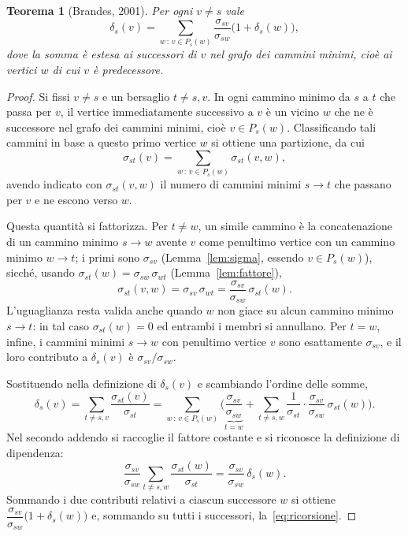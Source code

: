 \documentclass[11pt,a4paper]{report}
\newtheorem{teorema}{Teorema}
\begin{document}
\begin{teorema}[Brandes, 2001]\label{th:ricorsione}
	Per ogni $v\neq s$ vale
	\[
		\delta_s(v)=\sum_{w\,:\,v\in P_s(w)}
		\frac{\sigma_{sv}}{\sigma_{sw}}\bigl(1+\delta_s(w)\bigr),
	\]
	dove la somma è estesa ai \emph{successori} di $v$ nel grafo dei cammini
	minimi, cioè ai vertici $w$ di cui $v$ è predecessore.
\end{teorema}
\begin{proof}
	\renewcommand{\qedsymbol}{}
	Si fissi $v\neq s$ e un bersaglio $t\neq s,v$. In ogni cammino minimo da $s$ a
	$t$ che passa per $v$, il vertice immediatamente successivo a $v$ è un vicino
	$w$ che ne è successore nel grafo dei cammini minimi, cioè $v\in P_s(w)$.
	Classificando tali cammini in base a questo primo vertice $w$ si ottiene una
	partizione, da cui
	\[
		\sigma_{st}(v)=\sum_{w\,:\,v\in P_s(w)}\sigma_{st}(v,w),
	\]
	avendo indicato con $\sigma_{st}(v,w)$ il numero di cammini minimi $s\to t$ che
	passano per $v$ e ne escono verso $w$.

	Questa quantità si fattorizza. Per $t\neq w$, un simile cammino è la
	concatenazione di un cammino minimo $s\to w$ avente $v$ come penultimo vertice
	con un cammino minimo $w\to t$; i primi sono $\sigma_{sv}$ (Lemma~\ref{lem:sigma},
	essendo $v\in P_s(w)$), sicché, usando $\sigma_{st}(w)=\sigma_{sw}\,\sigma_{wt}$
	(Lemma~\ref{lem:fattore}),
	\[
		\sigma_{st}(v,w)=\sigma_{sv}\,\sigma_{wt}=\frac{\sigma_{sv}}{\sigma_{sw}}\,\sigma_{st}(w).
	\]
	L'uguaglianza resta valida anche quando $w$ non giace su alcun cammino minimo
	$s\to t$: in tal caso $\sigma_{st}(w)=0$ ed entrambi i membri si annullano. Per
	$t=w$, infine, i cammini minimi $s\to w$ con penultimo vertice $v$ sono
	esattamente $\sigma_{sv}$, e il loro contributo a $\delta_s(v)$ è
	$\sigma_{sv}/\sigma_{sw}$.

	Sostituendo nella definizione di $\delta_s(v)$ e scambiando l'ordine delle
	somme,
	\[
		\delta_s(v)=\sum_{t\neq s,v}\frac{\sigma_{st}(v)}{\sigma_{st}}
		=\sum_{w\,:\,v\in P_s(w)}\Biggl(
		\underbrace{\frac{\sigma_{sv}}{\sigma_{sw}}}_{t=w}
		+\sum_{t\neq s,w}\frac{1}{\sigma_{st}}\cdot\frac{\sigma_{sv}}{\sigma_{sw}}\,\sigma_{st}(w)
		\Biggr).
	\]
	Nel secondo addendo si raccoglie il fattore costante e si riconosce la
	definizione di dipendenza:
	\[
		\frac{\sigma_{sv}}{\sigma_{sw}}\sum_{t\neq s,w}\frac{\sigma_{st}(w)}{\sigma_{st}}
		=\frac{\sigma_{sv}}{\sigma_{sw}}\,\delta_s(w).
	\]
	Sommando i due contributi relativi a ciascun successore $w$ si ottiene
	$\dfrac{\sigma_{sv}}{\sigma_{sw}}\bigl(1+\delta_s(w)\bigr)$ e, sommando su tutti
	i successori, la~\eqref{eq:ricorsione}.
\end{proof}
\end{document}
